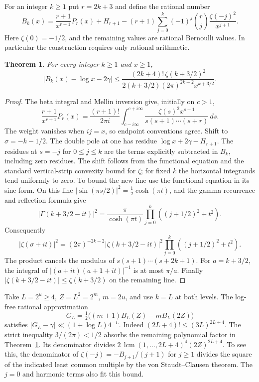 \documentclass[11pt,a4paper,oneside,openany]{report}
\newtheorem{theorem}{Theorem}[section]
\theoremstyle{remark}\newtheorem{remark}[theorem]{Remark}
\numberwithin{equation}{section}
\begin{document}
For an integer $k\ge1$ put $r=2k+3$ and define the rational number
\[
 B_k(x)=\frac{r+1}{x^{r+1}}P_r(x)+H_{r+1}
 -(r+1)\sum_{j=0}^{k}(-1)^j\binom rj
                    \frac{\zeta(-j)^2}{x^{j+1}}.
\]
Here $\zeta(0)=-1/2$, and the remaining values are rational Bernoulli
values. In particular the construction requires only rational arithmetic.

\begin{theorem}\label{ch5:px:uniform}
For every integer $k\ge1$ and $x\ge1$,
\[
 |B_k(x)-\log x-2\gamma|\le
 \frac{(2k+4)!\,\zeta(k+3/2)^2}
 {2(k+3/2)(2\pi)^{2k+2} x^{k+3/2}}.
\]
\end{theorem}

\begin{proof}
The beta integral and Mellin inversion give, initially on $c>1$,
\[
 \frac{r+1}{x^{r+1}}P_r(x)=
 \frac{(r+1)!}{2\pi i}\int_{c-i\infty}^{c+i\infty}
        \frac{\zeta(s)^2 x^{s-1}}{s(s+1)\cdots(s+r)}\,ds.
\]
The weight vanishes when $ij=x$, so endpoint conventions agree.
Shift to $\sigma=-k-1/2$. The double pole at one has residue
$\log x+2\gamma-H_{r+1}$. The residues at $s=-j$ for $0\le j\le k$
are the terms explicitly subtracted in $B_k$, including zero residues.
The shift follows from the functional equation and the standard
vertical-strip convexity bound for $\zeta$; for fixed $k$ the
horizontal integrands tend uniformly to zero. To bound the new
line use the functional equation in its sine form. On this line
$|\sin(\pi s/2)|^2=\tfrac12\cosh(\pi t)$, and the gamma recurrence
and reflection formula give
\[
 |\Gamma(k+3/2-it)|^2=\frac{\pi}{\cosh(\pi t)}
                   \prod_{j=0}^k((j+1/2)^2+t^2).
\]
Consequently
\[
 |\zeta(\sigma+it)|^2=
 (2\pi)^{-2k-2}|\zeta(k+3/2-it)|^2
                   \prod_{j=0}^k((j+1/2)^2+t^2).
\]
The product cancels the modulus of $s(s+1)\cdots(s+2k+1)$.
For $a=k+3/2$, the integral of
$|(a+it)(a+1+it)|^{-1}$ is at most $\pi/a$. Finally
$|\zeta(k+3/2-it)|\le\zeta(k+3/2)$ on the remaining line.
\end{proof}

Take $L=2^u\ge4$, $Z=L^2=2^m$, $m=2u$, and use $k=L$ at both levels.
The log-free rational approximation
\[
 G_L=\tfrac12\big((m+1)B_L(Z)-m B_L(2Z)\big)
\]
satisfies $|G_L-\gamma|\ll(1+\log L)4^{-L}$. Indeed
$(2L+4)!\le(3L)^{2L+4}$. The strict inequality $3/(2\pi)<1/2$ absorbs the remaining polynomial factor in
Theorem~\ref{ch5:px:uniform}. Its denominator divides
$2\,\operatorname{lcm}(1,\ldots,2L+4)^4(2Z)^{2L+4}$.
To see this, the denominator of $\zeta(-j)=-B_{j+1}/(j+1)$ for
$j\ge1$ divides the square of the indicated least common multiple
by the von Staudt--Clausen theorem. The $j=0$ and harmonic terms
also fit this bound.
\end{document}

